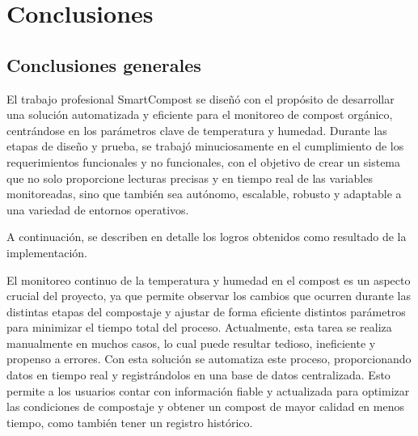 
\chapter{Conclusiones} %

\label{Chapter6} %




\section{Conclusiones generales }

El trabajo profesional SmartCompost se diseñó con el propósito de desarrollar una solución automatizada y eficiente para el monitoreo de compost orgánico, centrándose en los parámetros clave de temperatura y humedad. Durante las etapas de diseño y prueba, se trabajó minuciosamente en el cumplimiento de los requerimientos funcionales y no funcionales, con el objetivo de crear un sistema que no solo proporcione lecturas precisas y en tiempo real de las variables monitoreadas, sino que también sea autónomo, escalable, robusto y adaptable a una variedad de entornos operativos.

A continuación, se describen en detalle los logros obtenidos como resultado de la implementación.

El monitoreo continuo de la temperatura y humedad en el compost es un aspecto crucial del proyecto, ya que permite observar los cambios que ocurren durante las distintas etapas del compostaje y ajustar de forma eficiente distintos parámetros para minimizar el tiempo total del proceso. 
Actualmente, esta tarea se realiza manualmente en muchos casos, lo cual puede resultar tedioso, ineficiente y propenso a errores. Con esta solución se automatiza este proceso, proporcionando datos en tiempo real y registrándolos en una base de datos centralizada. Esto permite a los usuarios contar con información fiable y actualizada para optimizar las condiciones de compostaje y obtener un compost de mayor calidad en menos tiempo, como también tener un registro histórico.

